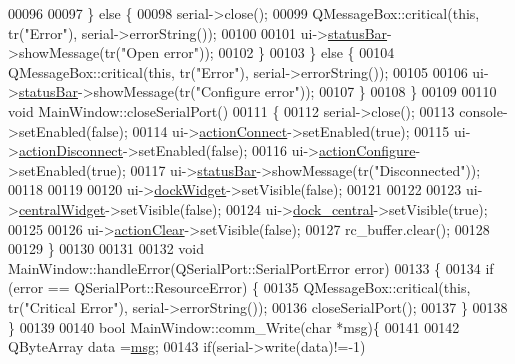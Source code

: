 \begin{DoxyCode}
{00096 
00097         \} \textcolor{keywordflow}{else} \{
00098             serial->close();
00099             QMessageBox::critical(\textcolor{keyword}{this}, tr(\textcolor{stringliteral}{"Error"}), serial->errorString());
00100 
00101             ui->\hyperlink{a00027_a50fa481337604bcc8bf68de18ab16ecd}{statusBar}->showMessage(tr(\textcolor{stringliteral}{"Open error"}));
00102         \}
00103     \} \textcolor{keywordflow}{else} \{
00104         QMessageBox::critical(\textcolor{keyword}{this}, tr(\textcolor{stringliteral}{"Error"}), serial->errorString());
00105 
00106         ui->\hyperlink{a00027_a50fa481337604bcc8bf68de18ab16ecd}{statusBar}->showMessage(tr(\textcolor{stringliteral}{"Configure error"}));
00107     \}
00108 \}
00109 
00110 \textcolor{keywordtype}{void} MainWindow::closeSerialPort()
00111 \{
00112     serial->close();
00113     console->setEnabled(\textcolor{keyword}{false});
00114     ui->\hyperlink{a00027_aa0785566311fc48271690fb68b1d4c5f}{actionConnect}->setEnabled(\textcolor{keyword}{true});
00115     ui->\hyperlink{a00027_a8a16b3aef75b279eaaa887152d2f746b}{actionDisconnect}->setEnabled(\textcolor{keyword}{false});
00116     ui->\hyperlink{a00027_a3860abde3cfd3f6170e28fddde73f11e}{actionConfigure}->setEnabled(\textcolor{keyword}{true});
00117     ui->\hyperlink{a00027_a50fa481337604bcc8bf68de18ab16ecd}{statusBar}->showMessage(tr(\textcolor{stringliteral}{"Disconnected"}));
00118 
00119 
00120     ui->\hyperlink{a00027_ac8a083c4b66fb317a9b538409ce412e2}{dockWidget}->setVisible(\textcolor{keyword}{false});
00121 
00122 
00123    ui->\hyperlink{a00027_a30075506c2116c3ed4ff25e07ae75f81}{centralWidget}->setVisible(\textcolor{keyword}{false});
00124    ui->\hyperlink{a00027_a19105d0d919fa33b5f29f7677bbab054}{dock\_central}->setVisible(\textcolor{keyword}{true});
00125 
00126    ui->\hyperlink{a00027_ac8539dcd87955047877cb256aff60453}{actionClear}->setVisible(\textcolor{keyword}{false});
00127       rc\_buffer.clear();
00128 
00129 \}
00130 
00131 
00132 \textcolor{keywordtype}{void} MainWindow::handleError(QSerialPort::SerialPortError error)
00133 \{
00134     \textcolor{keywordflow}{if} (error == QSerialPort::ResourceError) \{
00135         QMessageBox::critical(\textcolor{keyword}{this}, tr(\textcolor{stringliteral}{"Critical Error"}), serial->errorString());
00136         closeSerialPort();
00137     \}
00138 \}
00139 
00140 \textcolor{keywordtype}{bool} MainWindow::comm\_Write(\textcolor{keywordtype}{char} *msg)\{
00141 
00142     QByteArray data =\hyperlink{a00006_a6134b74dbfffbaf333e169bd09597b53}{msg};
00143     \textcolor{keywordflow}{if}(serial->write(data)!=-1)
}
\end{DoxyCode}
